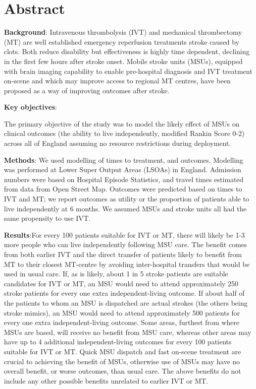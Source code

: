 \section*{Abstract}

\textbf{Background}: Intravenous thrombolysis (IVT) and mechanical thrombectomy (MT) are well established emergency reperfusion treatments stroke caused by clots. Both reduce disability but effectiveness is  highly time dependent, declining in the first few hours after stroke onset. Mobile stroke units (MSUs), equipped with brain imaging capability to enable pre-hospital diagnosis and IVT treatment on-scene and which may improve access to regional MT centres, have been proposed as a way of improving outcomes after stroke.

\textbf{Key objectives}:

The primary objective of the study was to model the likely effect of MSUs on clinical outcomes (the ability to live independently, modified Rankin Score 0-2) across all of England assuming no resource restrictions during deployment. 

\textbf{Methods}: We used modelling of times to treatment, and outcomes. Modelling was performed at Lower Super Output Areas (LSOAs) in England. Admission numbers were based on Hospital Episode Statistics, and travel times estimated from data from Open Street Map. Outcomes were predicted based on times to IVT and MT; we report outcomes as utility or the proportion of patients able to live independently at 6 months. We assumed MSUs and stroke units all had the same propensity to use IVT.

\textbf{Results}:For every 100 patients suitable for IVT or MT, there will likely be 1-3 more people who can live independently following MSU care. The benefit comes from both earlier IVT and the direct transfer of patients likely to benefit from MT to their closest MT-centre by avoiding inter-hospital transfers that would be used in usual care. If, as is likely, about 1 in 5 stroke patients are suitable candidates for IVT or MT, an MSU would need to attend approximately 250 stroke patients for every one extra independent-living outcome. If about half of the patients to whom an MSU is dispatched are actual strokes (the others being stroke mimics), an MSU would need to attend approximately 500 patients for every one extra independent-living outcome. Some areas, furthest from where MSUs are based, will receive no benefit from MSU care, whereas other areas may have up to 4 additional independent-living outcomes for every 100 patients suitable for IVT or MT. Quick MSU dispatch and fast on-scene treatment are crucial to achieving the benefit of MSUs, otherwise use of MSUs may have no overall benefit, or worse outcomes, than usual care. The above benefits do not include any other possible benefits unrelated to earlier IVT or MT.

